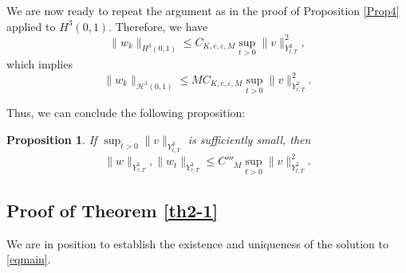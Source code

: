 \documentclass[10pt,a4paper,final]{article}
\numberwithin{equation}{section}
\newtheorem{prop}[theorem]{Proposition}
\newcommand{\cH}{\mathcal{H}}
\newcommand{\Ge}{\varepsilon}
\begin{document}
We are now ready to repeat the argument as in the proof of Proposition \ref{Prop4} applied to $H^3(0,1)$. Therefore, we have 
$$\|w_k\|_{H^3(0,1)}\leq C_{K,c,\Ge,M}\sup_{t>0}\|v\|_{Y^2_{t,T}}^2,$$
which implies 
$$\|w_k\|_{\cH^3(0,1)}\leq MC_{K,c,\Ge,M}\sup_{t>0}\|v\|_{Y^2_{t,T}}^2.$$

Thus, we can conclude the following proposition:

\begin{prop}
    If $\sup_{t>0}\|v\|_{Y^2_{t,T}}$ is sufficiently small, then 
    $$\|w\|_{Y^3_{\tau,T}},\|w_t\|_{Y^3_{\tau,T}}\leq C'''_M\sup_{t>0}\|v\|_{Y^2_{t,T}}^2. $$
\end{prop}


\subsection{Proof of  Theorem \ref{th2-1}}
We are in position to establish the existence and uniqueness of the solution to \eqref{eqmain}.
\end{document}

